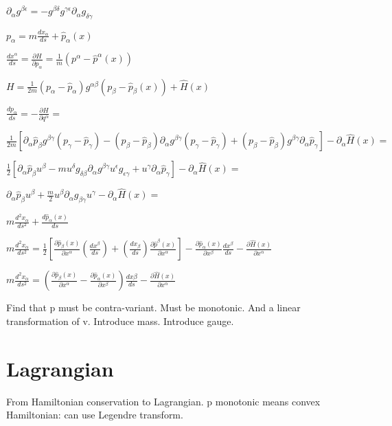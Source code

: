 \documentclass[aps,pra,10pt,twocolumn,floatfix,nofootinbib]{revtex4-1}
\theoremstyle{definition}
\begin{document}
$\partial_\alpha g^{\beta\epsilon} = - g^{\beta\delta} g^{\gamma\epsilon} \partial_\alpha g_{\delta\gamma} $

$p_\alpha=m\frac{dx_\alpha}{ds}+\hat{p}_\alpha(x)$


$\frac{dx^\alpha}{ds}=\frac{\partial H}{\partial p_\alpha}=\frac{1}{m}(p^\alpha-\hat{p}^\alpha(x))$

$H=\frac{1}{2m}(p_\alpha-\hat{p}_\alpha)g^{\alpha\beta}(p_\beta-\hat{p}_\beta(x))+\hat{H}(x)$

$\frac{dp_\alpha}{ds}=-\frac{\partial H}{\partial q^\alpha}=$

$\frac{1}{2m}[\partial_\alpha \hat{p}_\beta g^{\beta \gamma} (p_\gamma -\hat{p}_\gamma)
 - (p_\beta -\hat{p}_\beta) \partial_\alpha g^{\beta \gamma} (p_\gamma -\hat{p}_\gamma)
 + (p_\beta -\hat{p}_\beta) g^{\beta \gamma} \partial_\alpha \hat{p}_\gamma ]- \partial_\alpha \hat{H}(x)=$

$\frac{1}{2}[\partial_\alpha \hat{p}_\beta u^\beta
- m u^\delta g_{\delta\beta} \partial_\alpha g^{\beta \gamma} u^\epsilon g_{\epsilon\gamma}
+ u^\gamma \partial_\alpha \hat{p}_\gamma ]- \partial_\alpha \hat{H}(x)=$

$\partial_\alpha \hat{p}_\beta u^\beta + \frac{m}{2}u^\beta \partial_\alpha g_{\beta \gamma} u^\gamma
- \partial_\alpha \hat{H}(x)=$

$m\frac{d^2x_\alpha}{ds^2}+\frac{d\hat{p}_\alpha(x)}{ds}$

$m\frac{d^2x_\alpha}{ds^2}=\frac{1}{2}[\frac{\partial\hat{p}_\beta(x)}{\partial x^\alpha} (\frac{dx^\beta}{ds}) + (\frac{dx_\beta}{ds})\frac{\partial\hat{p}^\beta(x)}{\partial x^\alpha} ]-\frac{\partial\hat{p}_\alpha(x)}{\partial x^\beta}\frac{dx^\beta}{ds}
-\frac{\partial \hat{H}(x)}{\partial x^\alpha}$

$m\frac{d^2x_\alpha}{ds^2}=(\frac{\partial\hat{p}_\beta(x)}{\partial x^\alpha} - \frac{\partial\hat{p}_\alpha(x)}{\partial x^\beta} ) \frac{dx\beta}{ds}
-\frac{\partial \hat{H}(x)}{\partial x^\alpha}$

Find that p must be contra-variant. Must be monotonic. And a linear transformation of v. Introduce mass. Introduce gauge.

\section{Lagrangian}

From Hamiltonian conservation to Lagrangian. p monotonic means convex Hamiltonian: can use Legendre transform.
\end{document}
